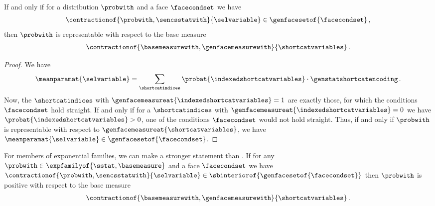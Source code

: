 \begin{theorem}
    \label{the:facePolytopeCharacterization}
    If and only if for a distribution $\probwith$ and a face $\facecondset$ we have
    \begin{align*}
        \contractionof{\probwith,\sencsstatwith}{\selvariable}\in\genfacesetof{\facecondset}\, ,
    \end{align*}
    then $\probwith$ is representable with respect to the base measure
    \begin{align*}
        \contractionof{\basemeasurewith,\genfacemeasurewith}{\shortcatvariables} \, .
    \end{align*}
\end{theorem}
\begin{proof}
    We have
    \begin{align*}
        \meanparamat{\selvariable} = \sum_{\shortcatindices} \probat{\indexedshortcatvariables}\cdot\genstatshortcatencoding \, .
    \end{align*}
    Now, the $\shortcatindices$ with $\genfacemeasureat{\indexedshortcatvariables}=1$ are exactly those, for which the conditions $\facecondset$ hold straight.
    If and only if for a $\shortcatindices$ with $\genfacemeasureat{\indexedshortcatvariables}=0$ we have $\probat{\indexedshortcatvariables}>0$, one of the conditions $\facecondset$ would not hold straight.
    Thus, if and only if $\probwith$ is representable with respect to $\genfacemeasureat{\shortcatvariables}$, we have $\meanparamat{\selvariable}\in\genfacesetof{\facecondset}$.
\end{proof}

For members of exponential families, we can make a stronger statement than .
If for any $\probwith\in\expfamilyof{\sstat,\basemeasure}$ and a face $\facecondset$ we have $\contractionof{\probwith,\sencsstatwith}{\selvariable}\in\sbinteriorof{\genfacesetof{\facecondset}}$ then $\probwith$ is positive with respect to the base measure
\begin{align*}
    \contractionof{\basemeasurewith,\genfacemeasurewith}{\shortcatvariables} \, .
\end{align*}

